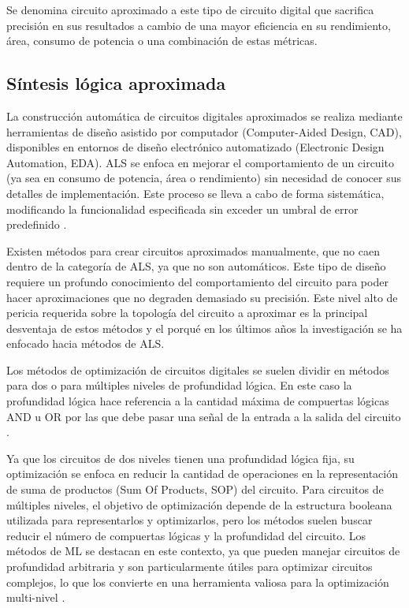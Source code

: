 Se denomina circuito aproximado a este tipo de circuito digital que sacrifica
precisión en sus resultados a cambio de una mayor eficiencia en su rendimiento,
área, consumo de potencia o una combinación de estas métricas.

\subsection{Síntesis lógica aproximada}

La construcción automática de circuitos digitales aproximados se realiza
mediante herramientas de diseño asistido por computador (Computer-Aided Design,
CAD), disponibles en entornos de diseño electrónico automatizado (Electronic
Design Automation, EDA). ALS se enfoca en mejorar el comportamiento de un
circuito (ya sea en consumo de potencia, área o rendimiento) sin necesidad de
conocer sus detalles de implementación. Este proceso se lleva a cabo de forma
sistemática, modificando la funcionalidad especificada sin exceder un umbral de
error predefinido \cite{ammes_two-level_2022}.

Existen métodos para crear circuitos aproximados manualmente, que no caen
dentro de la categoría de ALS, ya que no son automáticos. Este tipo de diseño
requiere un profundo conocimiento del comportamiento del circuito para poder
hacer aproximaciones que no degraden demasiado su precisión. Este nivel alto de
pericia requerida sobre la topología del circuito a aproximar es la principal
desventaja de estos métodos y el porqué en los últimos años la investigación se
ha enfocado hacia métodos de ALS.
\cite{ammes_two-level_2022}

Los métodos de optimización de circuitos digitales se suelen dividir en métodos
para dos o para múltiples niveles de profundidad lógica. En este caso la
profundidad lógica hace referencia a la cantidad máxima de compuertas lógicas
AND u OR por las que debe pasar una señal de la entrada a la salida del
circuito \cite{barr_investigation_1960}.

Ya que los circuitos de dos niveles tienen una profundidad lógica fija, su
optimización se enfoca en reducir la cantidad de operaciones en la
representación de suma de productos (Sum Of Products, SOP) del circuito. Para
circuitos de múltiples niveles, el objetivo de optimización depende de la
estructura booleana utilizada para representarlos y optimizarlos, pero los
métodos suelen buscar reducir el número de compuertas lógicas y la profundidad
del circuito. Los métodos de ML se destacan en este contexto, ya que pueden
manejar circuitos de profundidad arbitraria y son particularmente útiles para
optimizar circuitos complejos, lo que los convierte en una herramienta valiosa
para la optimización multi-nivel \cite{ammes_two-level_2022}.

